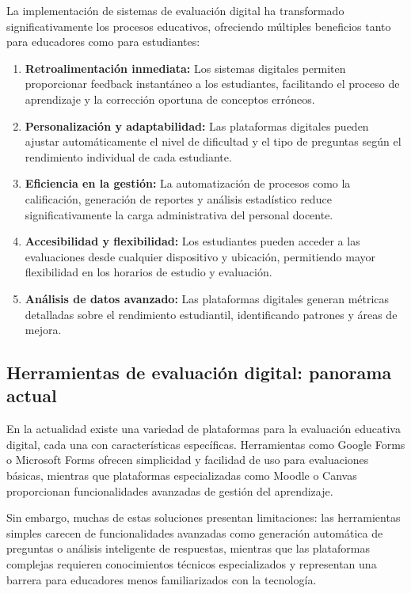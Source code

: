 \documentclass[12pt,a4paper]{report}
\begin{document}
La implementación de sistemas de evaluación digital ha transformado significativamente los procesos educativos, ofreciendo múltiples beneficios tanto para educadores como para estudiantes:

\begin{enumerate}
\item \textbf{Retroalimentación inmediata:} Los sistemas digitales permiten proporcionar feedback instantáneo a los estudiantes, facilitando el proceso de aprendizaje y la corrección oportuna de conceptos erróneos.

\item \textbf{Personalización y adaptabilidad:} Las plataformas digitales pueden ajustar automáticamente el nivel de dificultad y el tipo de preguntas según el rendimiento individual de cada estudiante.

\item \textbf{Eficiencia en la gestión:} La automatización de procesos como la calificación, generación de reportes y análisis estadístico reduce significativamente la carga administrativa del personal docente.

\item \textbf{Accesibilidad y flexibilidad:} Los estudiantes pueden acceder a las evaluaciones desde cualquier dispositivo y ubicación, permitiendo mayor flexibilidad en los horarios de estudio y evaluación.

\item \textbf{Análisis de datos avanzado:} Las plataformas digitales generan métricas detalladas sobre el rendimiento estudiantil, identificando patrones y áreas de mejora.
\end{enumerate}

\subsection{Herramientas de evaluación digital: panorama actual}

En la actualidad existe una variedad de plataformas para la evaluación educativa digital, cada una con características específicas. Herramientas como Google Forms o Microsoft Forms ofrecen simplicidad y facilidad de uso para evaluaciones básicas, mientras que plataformas especializadas como Moodle o Canvas proporcionan funcionalidades avanzadas de gestión del aprendizaje.

Sin embargo, muchas de estas soluciones presentan limitaciones: las herramientas simples carecen de funcionalidades avanzadas como generación automática de preguntas o análisis inteligente de respuestas, mientras que las plataformas complejas requieren conocimientos técnicos especializados y representan una barrera para educadores menos familiarizados con la tecnología.
\end{document}
